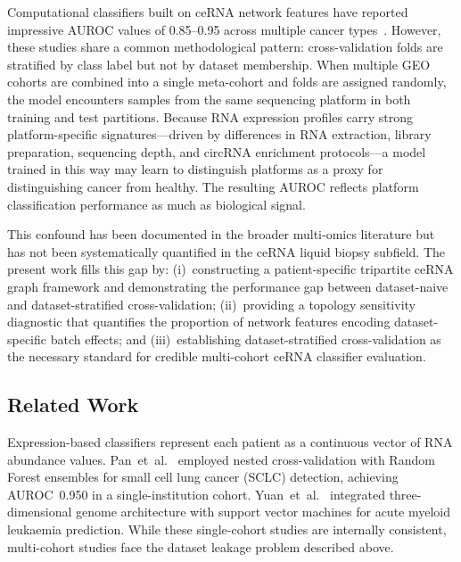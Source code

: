 \documentclass[12pt]{article}
\begin{document}
Computational classifiers built on ceRNA network features have reported
impressive AUROC values of 0.85--0.95 across multiple cancer
types~\citep{pan2026,yuan2026}. However, these studies share a common
methodological pattern: cross-validation folds are stratified by class
label but not by dataset membership. When multiple GEO cohorts are
combined into a single meta-cohort and folds are assigned randomly, the
model encounters samples from the same sequencing platform in both
training and test partitions. Because RNA expression profiles carry
strong platform-specific signatures---driven by differences in RNA
extraction, library preparation, sequencing depth, and circRNA
enrichment protocols---a model trained in this way may learn to
distinguish platforms as a proxy for distinguishing cancer from
healthy. The resulting AUROC reflects platform classification
performance as much as biological signal.

This confound has been documented in the broader multi-omics literature
\citep{leek2010} but has not been systematically quantified in the
ceRNA liquid biopsy subfield. The present work fills this gap by:
(i)~constructing a patient-specific tripartite ceRNA graph framework
and demonstrating the performance gap between dataset-naive and
dataset-stratified cross-validation; (ii)~providing a topology
sensitivity diagnostic that quantifies the proportion of network
features encoding dataset-specific batch effects; and
(iii)~establishing dataset-stratified cross-validation as the necessary
standard for credible multi-cohort ceRNA classifier evaluation.

\subsection{Related Work}

Expression-based classifiers represent each patient as a continuous
vector of RNA abundance values. Pan~et~al.~\citep{pan2026} employed
nested cross-validation with Random Forest ensembles for small cell lung
cancer (SCLC) detection, achieving AUROC~0.950 in a single-institution
cohort. Yuan~et~al.~\citep{yuan2026} integrated three-dimensional
genome architecture with support vector machines for acute myeloid
leukaemia prediction. While these single-cohort studies are internally
consistent, multi-cohort studies face the dataset leakage problem
described above.
\end{document}

